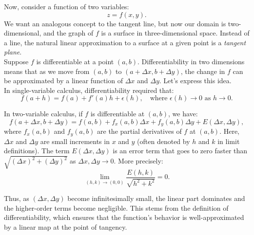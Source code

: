 \noindent Now, consider a function of two variables:
\[
z = f(x,y).
\]
We want an analogous concept to the tangent line, but now our domain is two-dimensional, and the graph of \( f \) is a surface in three-dimensional space. Instead of a line, the natural linear approximation to a surface at a given point is a \textit{tangent plane}. \\

\noindent Suppose \( f \) is differentiable at a point \((a,b)\). Differentiability in two dimensions means that as we move from \((a,b)\) to \((a+\Delta x, b+\Delta y)\), the change in \( f \) can be approximated by a linear function of \(\Delta x\) and \(\Delta y\). Let’s express this idea. \\

\noindent In single-variable calculus, differentiability required that:
\[
f(a+h) = f(a) + f'(a)h + \epsilon(h), \quad \text{where } \epsilon(h) \to 0 \text{ as } h \to 0.
\]

\noindent In two-variable calculus, if \( f \) is differentiable at \((a,b)\), we have:
\[
f(a+\Delta x, b+\Delta y) = f(a,b) + f_x(a,b)\Delta x + f_y(a,b)\Delta y + E(\Delta x,\Delta y),
\]
where \( f_x(a,b) \) and \( f_y(a,b) \) are the partial derivatives of \( f \) at \((a,b)\). Here, \(\Delta x\) and \(\Delta y\) are small increments in \( x \) and \( y \) (often denoted by \( h \) and \( k \) in limit definitions). The term \( E(\Delta x,\Delta y) \) is an error term that goes to zero faster than \(\sqrt{(\Delta x)^2 + (\Delta y)^2}\) as \(\Delta x,\Delta y \to 0\). More precisely:
\[
\lim_{(h,k)\to(0,0)} \frac{E(h,k)}{\sqrt{h^2+k^2}} = 0.
\]

\noindent Thus, as \((\Delta x,\Delta y)\) become infinitesimally small, the linear part dominates and the higher-order terms become negligible. This stems from the definition of differentiability, which ensures that the function's behavior is well-approximated by a linear map at the point of tangency.

